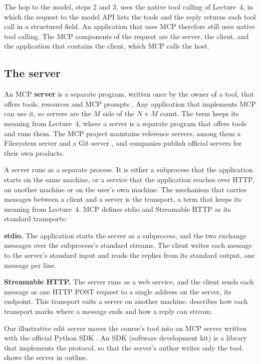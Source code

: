 The hop to the model, steps 2 and 3, uses the native tool calling of Lecture~4, in which the request
to the model API lists the tools and the reply returns each tool call in a structured field. An
application that uses MCP therefore still uses native tool calling. The MCP components of the
request are the server, the client, and the application that contains the client, which MCP calls
the host.

\subsection{The server}
\label{sec:mcp-server}

An MCP \textbf{server} is a separate program, written once by the owner of a tool, that offers
tools, resources and MCP prompts \citep{mcp-spec-2026}. Any application that implements MCP can
use it, so servers are the $M$ side of the $N + M$ count. The term keeps its meaning from
Lecture~4, where a server is a separate program that offers tools and runs them. The MCP project
maintains reference servers, among them a Filesystem server and a Git server \citep{mcp-servers},
and companies publish official servers for their own products.

A server runs as a separate process. It is either a subprocess that the application starts on the
same machine, or a service that the application reaches over HTTP, on another machine or on the
user's own machine. The mechanism that carries messages between a client and a server is the
transport, a term that keeps its meaning from Lecture~4. MCP defines stdio and
Streamable HTTP as its standard transports:
\bi
\item \textbf{stdio.} The application starts the server as a subprocess, and the two exchange
messages over the subprocess's standard streams. The client writes each message to the server's
standard input and reads the replies from its standard output, one message per line.
\item \textbf{Streamable HTTP.} The server runs as a web service, and the client sends each message
as one HTTP POST request to a single address on the server, its endpoint. This transport suits a
server on another machine.
\ei
{} describes how each transport marks where a message ends and how a reply can
stream.

Our illustrative edit server moves the course's  tool into an MCP server written with
the official Python SDK \citep{mcp-python-sdk}. An SDK (software development kit) is a library that
implements the protocol, so that the server's author writes only the tool. 
shows the server in outline.

